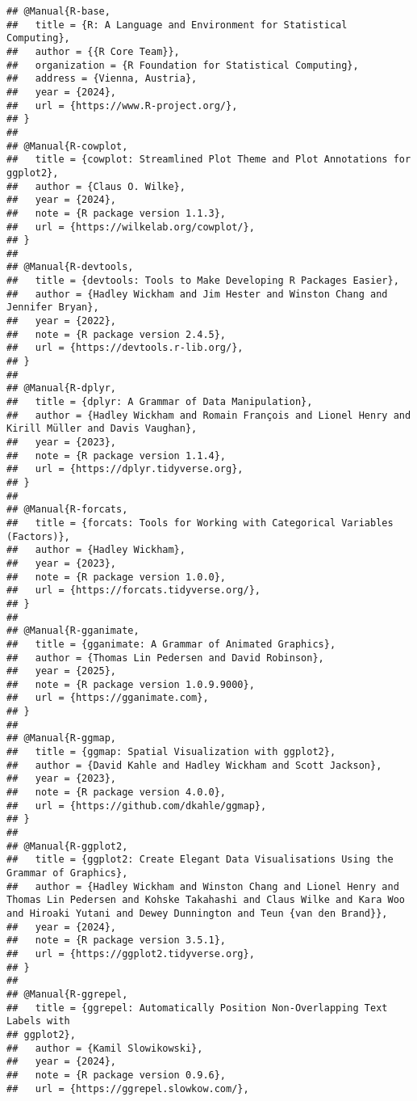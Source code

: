 \documentclass[
]{article}
\begin{document}
\begin{verbatim}
## @Manual{R-base,
##   title = {R: A Language and Environment for Statistical Computing},
##   author = {{R Core Team}},
##   organization = {R Foundation for Statistical Computing},
##   address = {Vienna, Austria},
##   year = {2024},
##   url = {https://www.R-project.org/},
## }
## 
## @Manual{R-cowplot,
##   title = {cowplot: Streamlined Plot Theme and Plot Annotations for ggplot2},
##   author = {Claus O. Wilke},
##   year = {2024},
##   note = {R package version 1.1.3},
##   url = {https://wilkelab.org/cowplot/},
## }
## 
## @Manual{R-devtools,
##   title = {devtools: Tools to Make Developing R Packages Easier},
##   author = {Hadley Wickham and Jim Hester and Winston Chang and Jennifer Bryan},
##   year = {2022},
##   note = {R package version 2.4.5},
##   url = {https://devtools.r-lib.org/},
## }
## 
## @Manual{R-dplyr,
##   title = {dplyr: A Grammar of Data Manipulation},
##   author = {Hadley Wickham and Romain François and Lionel Henry and Kirill Müller and Davis Vaughan},
##   year = {2023},
##   note = {R package version 1.1.4},
##   url = {https://dplyr.tidyverse.org},
## }
## 
## @Manual{R-forcats,
##   title = {forcats: Tools for Working with Categorical Variables (Factors)},
##   author = {Hadley Wickham},
##   year = {2023},
##   note = {R package version 1.0.0},
##   url = {https://forcats.tidyverse.org/},
## }
## 
## @Manual{R-gganimate,
##   title = {gganimate: A Grammar of Animated Graphics},
##   author = {Thomas Lin Pedersen and David Robinson},
##   year = {2025},
##   note = {R package version 1.0.9.9000},
##   url = {https://gganimate.com},
## }
## 
## @Manual{R-ggmap,
##   title = {ggmap: Spatial Visualization with ggplot2},
##   author = {David Kahle and Hadley Wickham and Scott Jackson},
##   year = {2023},
##   note = {R package version 4.0.0},
##   url = {https://github.com/dkahle/ggmap},
## }
## 
## @Manual{R-ggplot2,
##   title = {ggplot2: Create Elegant Data Visualisations Using the Grammar of Graphics},
##   author = {Hadley Wickham and Winston Chang and Lionel Henry and Thomas Lin Pedersen and Kohske Takahashi and Claus Wilke and Kara Woo and Hiroaki Yutani and Dewey Dunnington and Teun {van den Brand}},
##   year = {2024},
##   note = {R package version 3.5.1},
##   url = {https://ggplot2.tidyverse.org},
## }
## 
## @Manual{R-ggrepel,
##   title = {ggrepel: Automatically Position Non-Overlapping Text Labels with
## ggplot2},
##   author = {Kamil Slowikowski},
##   year = {2024},
##   note = {R package version 0.9.6},
##   url = {https://ggrepel.slowkow.com/},

\end{verbatim}
\end{document}
